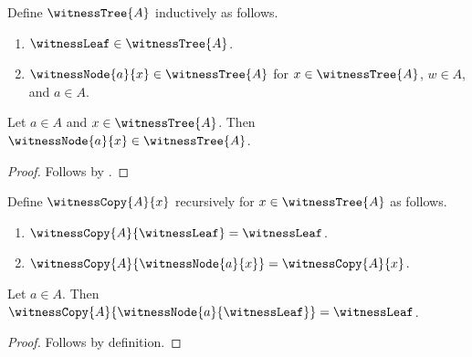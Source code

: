 

\begin{datatype}\label{witness_tree}
    Define $\witnessTree{A}$ inductively as follows.
    \begin{enumerate}
        \item[Leaf] $\witnessLeaf\in\witnessTree{A}$.
        \item[Node] $\witnessNode{a}{x}\in\witnessTree{A}$ for
            $x\in\witnessTree{A}$, $w\in A$, and $a\in A$.
    \end{enumerate}
\end{datatype}

\begin{classification}\label{witness_node_formation}
    Let $a\in A$ and $x\in\witnessTree{A}$.
    Then $\witnessNode{a}{x}\in\witnessTree{A}$.
\end{classification}
\begin{proof}
    Follows by .
\end{proof}

\begin{recursive-definition}\label{witness_copy}
    Define $\witnessCopy{A}{x}$ recursively for $x\in\witnessTree{A}$ as follows.
    \begin{enumerate}
        \item[Leaf] $\witnessCopy{A}{\witnessLeaf}=\witnessLeaf$.
        \item[Node] $\witnessCopy{A}{\witnessNode{a}{x}}=\witnessCopy{A}{x}$.
    \end{enumerate}
\end{recursive-definition}

\begin{proposition}\label{witness_copy_use}
    Let $a\in A$.
    Then $\witnessCopy{A}{\witnessNode{a}{\witnessLeaf}}=\witnessLeaf$.
\end{proposition}
\begin{proof}
    Follows by definition.
\end{proof}
